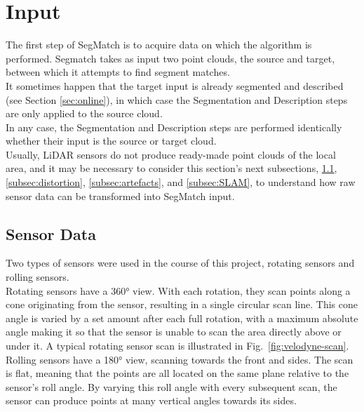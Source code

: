 \section{Input}
\label{sec:input}

The first step of SegMatch is to acquire data on which the algorithm is performed. Segmatch takes as input two point clouds, the source and target, between which it attempts to find segment matches.\\

It sometimes happen that the target input is already segmented and described (see Section \ref{sec:online}), in which case the Segmentation and Description steps are only applied to the source cloud.\\

In any case, the Segmentation and Description steps are performed identically whether their input is the source or target cloud.\\

Usually, LiDAR sensors do not produce ready-made point clouds of the local area, and it may be necessary to consider this section's next subsections, \ref{subsec:sensordata}, \ref{subsec:distortion}, \ref{subsec:artefacts}, and \ref{subsec:SLAM}, to understand how raw sensor data can be transformed into SegMatch input.

\subsection{Sensor Data}
\label{subsec:sensordata}

Two types of sensors were used in the course of this project, rotating sensors and rolling sensors. \\

Rotating sensors have a 360° view. With each rotation, they scan points along a cone originating from the sensor, resulting in a single circular scan line. This cone angle is varied by a set amount after each full rotation, with a maximum absolute angle making it so that the sensor is unable to scan the area directly above or under it. A typical rotating sensor scan is illustrated in Fig.~\ref{fig:velodyne-scan}.\\

Rolling sensors have a 180° view, scanning towards the front and sides. The scan is flat, meaning that the points are all located on the same plane relative to the sensor’s roll angle. By varying this roll angle with every subsequent scan, the sensor can produce points at many vertical angles towards its sides.\\

